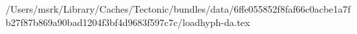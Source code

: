 /Users/msrk/Library/Caches/Tectonic/bundles/data/6ffe055852f8faf66c0acbe1a7fb27f87b869a90bad1204f3bf4d9683f597c7c/loadhyph-da.tex